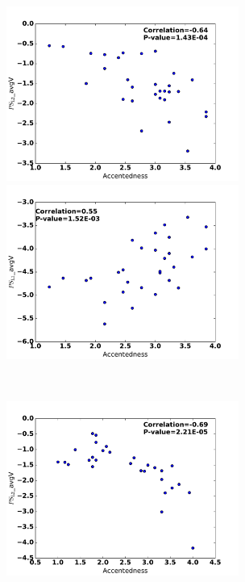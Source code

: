 \begin{figure}[t]
        \begin{minipage}[t]{0.5\linewidth}
        \centering
            \includegraphics[width=3in]{figures/seg_scatter/figure2_1.pdf}
        \end{minipage}%
        \begin{minipage}[t]{0.5\linewidth}
        \centering
            \includegraphics[width=3in]{figures/seg_scatter/figure2_2.pdf}
        \end{minipage}%
        \\
        \begin{minipage}[t]{0.5\linewidth}
        \centering
            \includegraphics[width=3in]{figures/seg_scatter/figure2_3.pdf}
        \end{minipage}%
        \begin{minipage}[t]{0.5\linewidth}

\end{minipage}
\end{figure}
